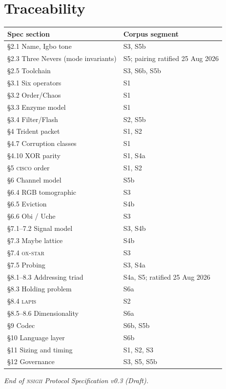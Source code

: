 \documentclass[11pt,a4paper]{article}
\newcommand{\NSIGII}{\textsc{nsigii}}
\newcommand{\CISCO}{\textsc{cisco}}
\newcommand{\LAPIS}{\textsc{lapis}}
\begin{document}
\section{Traceability}

\begin{center}
\begin{tabular}{@{}ll@{}}
\toprule
\textbf{Spec section} & \textbf{Corpus segment} \\
\midrule
\S2.1 Name, Igbo tone & S3, S5b \\
\S2.3 Three Nevers (mode invariants) & S5; pairing ratified 25 Aug 2026 \\
\S2.5 Toolchain & S3, S6b, S5b \\
\S3.1 Six operators & S1 \\
\S3.2 Order/Chaos & S1 \\
\S3.3 Enzyme model & S1 \\
\S3.4 Filter/Flash & S2, S5b \\
\S4 Trident packet & S1, S2 \\
\S4.7 Corruption classes & S1 \\
\S4.10 XOR parity & S1, S4a \\
\S5 \CISCO{} order & S1, S2 \\
\S6 Channel model & S5b \\
\S6.4 RGB tomographic & S3 \\
\S6.5 Eviction & S4b \\
\S6.6 Obi / Uche & S3 \\
\S7.1--7.2 Signal model & S3, S4b \\
\S7.3 Maybe lattice & S4b \\
\S7.4 \textsc{ox-star} & S3 \\
\S7.5 Probing & S3, S4a \\
\S8.1--8.3 Addressing triad & S4a, S5; ratified 25 Aug 2026 \\
\S8.3 Holding problem & S6a \\
\S8.4 \LAPIS{} & S2 \\
\S8.5--8.6 Dimensionality & S6a \\
\S9 Codec & S6b, S5b \\
\S10 Language layer & S6b \\
\S11 Sizing and timing & S1, S2, S3 \\
\S12 Governance & S3, S5, S5b \\
\bottomrule
\end{tabular}
\end{center}

\vfill
\begin{center}
\emph{End of \NSIGII{} Protocol Specification v0.3 (Draft).}
\end{center}
\end{document}
